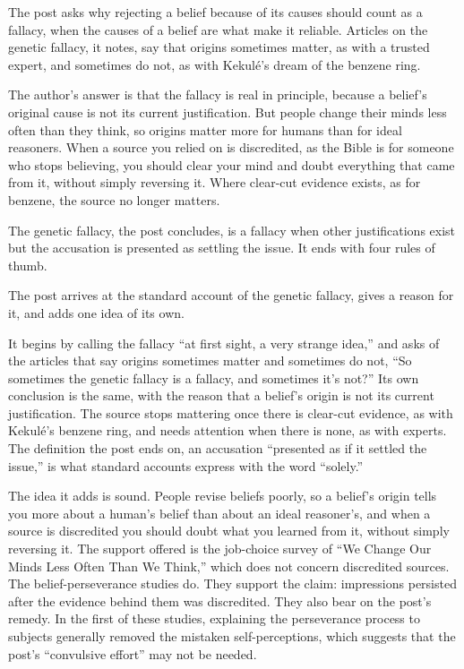 \begin{afterword}
\summaryhead

The post asks why rejecting a belief because of its causes should count as a fallacy, when the causes of a belief are what make it reliable. Articles on the genetic fallacy, it notes, say that origins sometimes matter, as with a trusted expert, and sometimes do not, as with Kekulé's dream of the benzene ring.

The author's answer is that the fallacy is real in principle, because a belief's original cause is not its current justification. But people change their minds less often than they think, so origins matter more for humans than for ideal reasoners. When a source you relied on is discredited, as the Bible is for someone who stops believing, you should clear your mind and doubt everything that came from it, without simply reversing it. Where clear-cut evidence exists, as for benzene, the source no longer matters.

The genetic fallacy, the post concludes, is a fallacy when other justifications exist but the accusation is presented as settling the issue. It ends with four rules of thumb.

\responsehead

The post arrives at the standard account of the genetic fallacy, gives a reason for it, and adds one idea of its own.

It begins by calling the fallacy ``at first sight, a very strange idea,'' and asks of the articles that say origins sometimes matter and sometimes do not, ``So sometimes the genetic fallacy is a fallacy, and sometimes it's not?'' Its own conclusion is the same, with the reason that a belief's origin is not its current justification. The source stops mattering once there is clear-cut evidence, as with Kekulé's benzene ring, and needs attention when there is none, as with experts. The definition the post ends on, an accusation ``presented as if it settled the issue,'' is what standard accounts express with the word ``solely.''

The idea it adds is sound. People revise beliefs poorly, so a belief's origin tells you more about a human's belief than about an ideal reasoner's, and when a source is discredited you should doubt what you learned from it, without simply reversing it. The support offered is the job-choice survey of ``We Change Our Minds Less Often Than We Think,'' which does not concern discredited sources. The belief-perseverance studies do. They support the claim: impressions persisted after the evidence behind them was discredited. They also bear on the post's remedy. In the first of these studies, explaining the perseverance process to subjects generally removed the mistaken self-perceptions, which suggests that the post's ``convulsive effort'' may not be needed.


\end{afterword}
